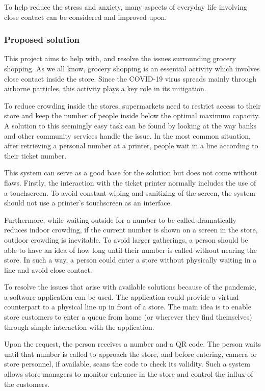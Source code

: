 To help reduce the stress and anxiety, many aspects of everyday life involving close contact can be considered and improved upon. 

\subsubsection{Proposed solution}
\hspace{\parindent}This project aims to help with, and resolve the issues surrounding grocery shopping. As we all know, grocery shopping is an essential activity which involves close contact inside the store. Since the COVID-19 virus spreads mainly through airborne particles, this activity plays a key role in its mitigation. 

To reduce crowding inside the stores, supermarkets need to restrict access to their store and keep the number of people inside below the optimal maximum capacity. A solution to this seemingly easy task can be found by looking at the way banks and other community services handle the issue. In the most common situation, after retrieving a personal number at a printer, people wait in a line according to their ticket number. 

This system can serve as a good base for the solution but does not come without flaws. Firstly, the interaction with the ticket printer normally includes the use of a touchscreen. To avoid constant wiping and sanitizing of the screen, the system should not use a printer's touchscreen as an interface. 

Furthermore, while waiting outside for a number to be called dramatically reduces indoor crowding, if the current number is shown on a screen in the store, outdoor crowding is inevitable. To avoid larger gatherings, a person should be able to have an idea of how long until their number is called without nearing the store. In such a way, a person could enter a store without physically waiting in a line and avoid close contact.

To resolve the issues that arise with available solutions
because of the pandemic, a software application can be used. The application could provide a virtual counterpart to a physical line up in front of a store. The main idea is to enable store customers to enter a queue from home (or wherever they find themselves) through simple interaction with the application.

Upon the request, the person receives a number and a QR code. The person waits until that number is called to approach the store, and before entering, camera or store personnel, if available, scans the code to check its validity. Such a system allows store managers to monitor entrance in the store and control the influx of the customers. 

